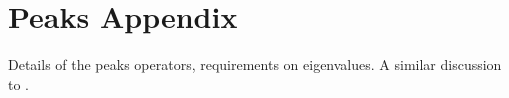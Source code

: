 \chapter{Peaks Appendix}
\label{PeaksAppendix}
\graphicspath{{Figures/PeaksAppendix/}{Figures/Common/}}

Details of the peaks operators, requirements on eigenvalues. A similar discussion to \citep{Leonhardt:2003}.